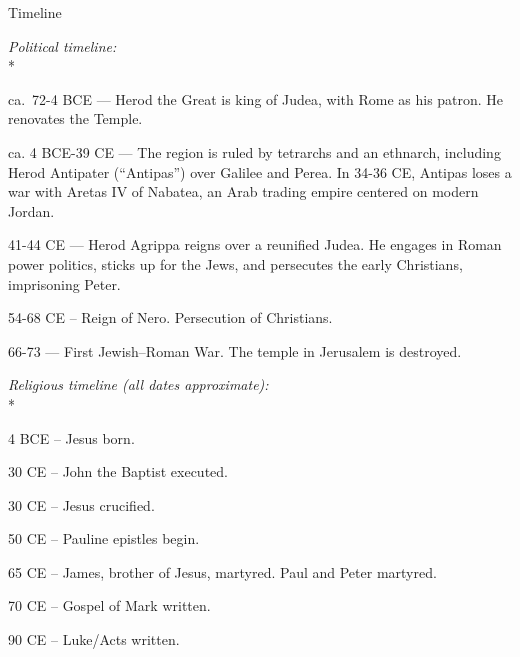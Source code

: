 \documentclass[10pt,twoside]{article} %
\newcommand{\doimage}[2]{\texttt{[image: \#2]}\label{fig:#2}}
\newcommand{\figbasic}[4]{ %
    \ifthenelse{\isodd{\pageref{fig:#2}}}{}{\hfill}
    \ifstrempty{#3}{
      \doimage{#1}{#2}
    }{
      \makebox{\doimage{#1}{#2} \\ #3}
    }
    \ifthenelse{\isodd{\pageref{fig:#2}}}{\hfill}{}
    \par
}
\newcommand{\fig}[2][0.4]{
  \figbasic{#1}{#2}{}{}
}
\newcommand{\subhead}[1]{\emph{#1}\\*}
\begin{document}
\begin{section}{Timeline}

\subhead{Political timeline:}

ca.~72-4 BCE --- Herod the Great is king of Judea, with Rome as his patron. He renovates the Temple.

ca. 4 BCE-39 CE --- The region is ruled by tetrarchs and an ethnarch, including Herod Antipater (``Antipas'') over Galilee and Perea.
      In 34-36 CE, Antipas loses a war with Aretas IV of Nabatea, an Arab trading empire centered on modern Jordan.

41-44 CE --- Herod Agrippa reigns over a reunified Judea. He engages in Roman power politics, sticks up for the Jews,
      and persecutes the early Christians, imprisoning Peter.

54-68 CE -- Reign of Nero. Persecution of Christians.

66-73 --- First Jewish–Roman War. The temple in Jerusalem is destroyed.

\subhead{Religious timeline (all dates approximate):}

4 BCE -- Jesus born.

30 CE -- John the Baptist executed.

30 CE -- Jesus crucified.

50 CE -- Pauline epistles begin.

65 CE -- James, brother of Jesus, martyred. Paul and Peter martyred.

70 CE -- Gospel of Mark written.

90 CE -- Luke/Acts written.

\end{section}

\vfill

\pagebreak

\fig{john-in-the-wilderness}
\end{document}
